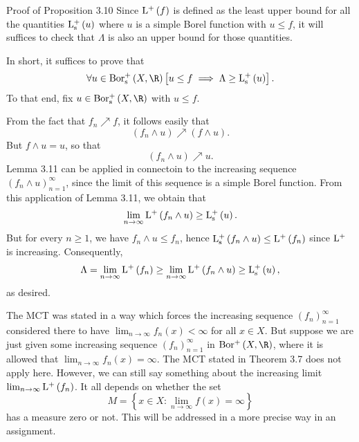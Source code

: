 \documentclass[pmath450]{subfiles}
\begin{document}
    \begin{boxyproof}{Proof of Proposition 3.10}
        Since $\operatorname{L^+}\left( f \right)$ is defined as the least upper bound for all the quantities $\operatorname{L^+_s}\left( u \right)$ where $u$ is a simple Borel function with $u\leq f$, it will suffices to check that $\Lambda$ is also an upper bound for those quantities.

        In short, it suffices to prove that
        \begin{equation*}
            \forall u\in\borpluss\left( X,\R \right)\left[ u\leq f\implies \Lambda\geq\lpluss\left( u \right) \right].
        \end{equation*}
        To that end, fix $u\in\borpluss\left( X,\R \right)$ with $u\leq f$.

        From the fact that $f_n\nearrow f$, it follows easily that
        \begin{equation*}
            \left( f_n\wedge u \right)\nearrow \left( f\wedge u \right).
        \end{equation*}
        But $f\wedge u = u$, so that
        \begin{equation*}
            \left( f_n\wedge u \right)\nearrow u.
        \end{equation*}
        Lemma 3.11 can be applied in connectoin to the increasing sequence $\left( f_{n}\wedge u \right)^{\infty}_{n=1}$, since the limit of this sequence is a simple Borel function. From this application of Lemma 3.11, we obtain that
        \begin{equation*}
            \lim_{n\to\infty}\operatorname{L^+}\left( f_n\wedge u \right)\geq \operatorname{L^+_s}\left( u \right).
        \end{equation*}
        But for every $n\geq 1$, we have $f_n\wedge u\leq f_n$, hence $\operatorname{L^+_s}\left( f_n\wedge u \right)\leq\operatorname{L^+}\left( f_n \right)$ since $\operatorname{L^+}$ is increasing. Consequently,
        \begin{equation*}
            \Lambda = \lim_{n\to\infty}\operatorname{L^+}\left( f_n \right) \geq \lim_{n\to\infty}\operatorname{L^+}\left( f_n\wedge u \right) \geq \operatorname{L^+_s}\left( u \right),
        \end{equation*}
        as desired.
    \end{boxyproof}

    \np The MCT was stated in a way which forces the increasing sequence $\left( f_{n} \right)^{\infty}_{n=1}$ considered there to have $\lim_{n\to\infty}f_n\left( x \right)<\infty$ for all $x\in X$. But suppose we are just given some increasing sequence $\left( f_{n} \right)^{\infty}_{n=1}$ in $\borplus\left( X,\R \right)$, where it is allowed that $\lim_{n\to\infty}f_n\left( x \right)=\infty$. The MCT stated in Theorem 3.7 does not apply here. However, we can still say something about the increasing limit $\lim_{n\to\infty}\operatorname{L^+}\left( f_n \right)$. It all depends on whether the set
    \begin{equation*}
        M = \left\lbrace x\in X: \lim_{n\to\infty}f\left( x \right)=\infty \right\rbrace
    \end{equation*}
    has a measure zero or not. This will be addressed in a more precise way in an assignment.
\end{document}
